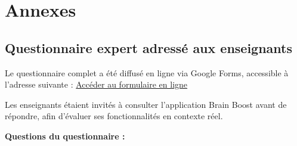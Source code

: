 \documentclass[a4paper,11pt]{report}
\begin{document}

\chapter*{Annexes}
\section{Questionnaire expert adressé aux enseignants}


Le questionnaire complet a été diffusé en ligne via Google Forms, accessible à l'adresse suivante :
\href{https://docs.google.com/forms/d/e/1FAIpQLScrGvKIABGyxDWCvz3-zz0gXQmpoJBh4uygt0I7vd-VB6dgSQ/viewform?usp=dialog}{Accéder au formulaire en ligne}

Les enseignants étaient invités à consulter l'application Brain Boost avant de répondre, afin d'évaluer ses fonctionnalités en contexte réel.

\textbf{Questions du questionnaire :}
\end{document}
